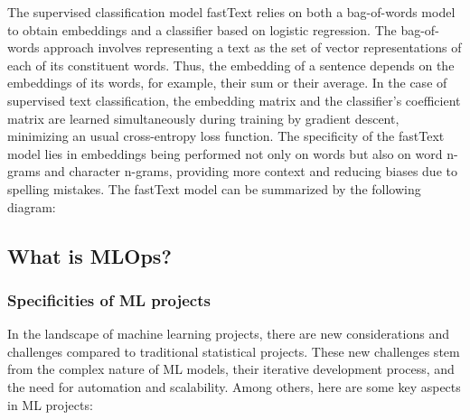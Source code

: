 The supervised classification model fastText relies on both a bag-of-words model to obtain embeddings and a classifier based on logistic regression. The bag-of-words approach involves representing a text as the set of vector representations of each of its constituent words. Thus, the embedding of a sentence depends on the embeddings of its words, for example, their sum or their average. In the case of supervised text classification, the embedding matrix and the classifier's coefficient matrix are learned simultaneously during training by gradient descent, minimizing an usual cross-entropy loss function. The specificity of the fastText model lies in embeddings being performed not only on words but also on word n-grams and character n-grams, providing more context and reducing biases due to spelling mistakes. The fastText model can be summarized by the following diagram:


\subsection{What is MLOps?}


\subsubsection{Specificities of ML projects}

In the landscape of machine learning projects, there are new considerations and challenges compared to traditional statistical projects. These new challenges stem from the complex nature of ML models, their iterative development process, and the need for automation and scalability. Among others, here are some key aspects in ML projects:

